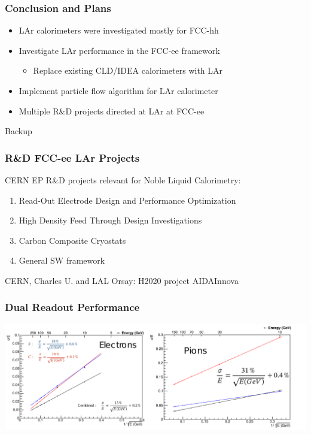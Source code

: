 \documentclass[aspectratio=169]{beamer}
\newcommand{\backupbegin}{%
   \newcounter{finalframe}
   \setcounter{finalframe}{\value{framenumber}}
}
\newcommand{\redtext}[1]{%
  \textcolor{myRed}{#1}
}
\begin{document}
\begin{frame}
  \frametitle{Conclusion and Plans}

  \begin{itemize}
    \item LAr calorimeters were investigated mostly for FCC-hh
    \item Investigate LAr performance in the FCC-ee framework
          \begin{itemize}
            \item Replace existing CLD/IDEA calorimeters with LAr
          \end{itemize}
    \item Implement particle flow algorithm for LAr calorimeter
    \item Multiple R\&D projects directed at LAr at FCC-ee
  \end{itemize}
\end{frame}

%
%
\appendix
\backupbegin{}

\begin{frame}[c]
  \begin{center}
    \redtext{\Huge Backup}
  \end{center}
\end{frame}


\begin{frame}
  \frametitle{R\&D FCC-ee LAr Projects}

  CERN EP R\&D projects relevant for Noble Liquid Calorimetry:

  \begin{enumerate}
    \item Read-Out Electrode Design and Performance Optimization
    \item High Density Feed Through Design Investigations
    \item Carbon Composite Cryostats
    \item General SW framework
  \end{enumerate}

  CERN, Charles U. and LAL Orsay: H2020 project AIDAInnova

\end{frame}


\begin{frame}
  \frametitle{Dual Readout Performance}

  \includegraphics[width=\linewidth]{figures/dual_readout_performance.pdf}
\end{frame}
\end{document}
